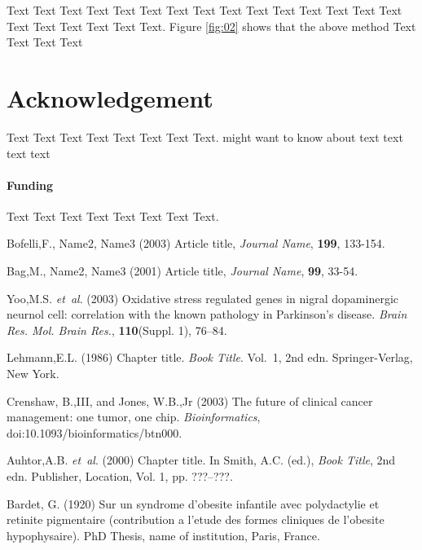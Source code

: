 \documentclass{bioinfo}
\begin{document}
Text Text Text Text Text Text  Text Text Text Text Text Text Text Text Text  Text Text Text Text Text Text. Figure \ref{fig:02} shows that the above method  Text Text Text Text


\section*{Acknowledgement}
Text Text Text Text Text Text  Text Text.  \citealp{Boffelli03} might want to know about  text text text text

\paragraph{Funding\textcolon} Text Text Text Text Text Text  Text Text.

%
%
%
%
%
%
%
%
%


\begin{thebibliography}{}
 Bofelli,F., Name2, Name3 (2003) Article title, {\it Journal Name}, {\bf 199}, 133-154.

 Bag,M., Name2, Name3 (2001) Article title, {\it Journal Name}, {\bf 99}, 33-54.

Yoo,M.S. \textit{et~al}. (2003) Oxidative stress regulated genes
in nigral dopaminergic neurnol cell: correlation with the known
pathology in Parkinson's disease. \textit{Brain Res. Mol. Brain
Res.}, \textbf{110}(Suppl. 1), 76--84.

Lehmann,E.L. (1986) Chapter title. \textit{Book Title}. Vol.~1, 2nd edn. Springer-Verlag, New York.

Crenshaw, B.,III, and Jones, W.B.,Jr (2003) The future of clinical
cancer management: one tumor, one chip. \textit{Bioinformatics},
doi:10.1093/bioinformatics/btn000.

Auhtor,A.B. \textit{et~al}. (2000) Chapter title. In Smith, A.C.
(ed.), \textit{Book Title}, 2nd edn. Publisher, Location, Vol. 1, pp.
???--???.

Bardet, G. (1920) Sur un syndrome d'obesite infantile avec
polydactylie et retinite pigmentaire (contribution a l'etude des
formes cliniques de l'obesite hypophysaire). PhD Thesis, name of
institution, Paris, France.

\end{thebibliography}
\end{document}
